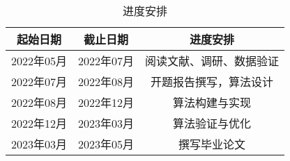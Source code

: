 \begin{table}[htbp]
	\centering
	\caption{进度安排}\label{table:jinduanpai}
	\vspace{0.5em}\wuhao
	\begin{tabularx}{1\textwidth}{ccc}
		\toprule
		起始日期        & 截止日期     & 进度安排    \\
		\midrule
		2022年05月           & 2022年07月           & 阅读文献、调研、数据验证      \\
		2022年07月          & 2022年08月  & 开题报告撰写，算法设计  \\
		2022年08月         & 2022年12月   & 算法构建与实现  \\
		2022年12月           & 2023年03月  & 算法验证与优化 \\
		2023年03月          & 2023年05月 &      撰写毕业论文     \\


		\bottomrule
	\end{tabularx}
\end{table}


\FloatBarrier




